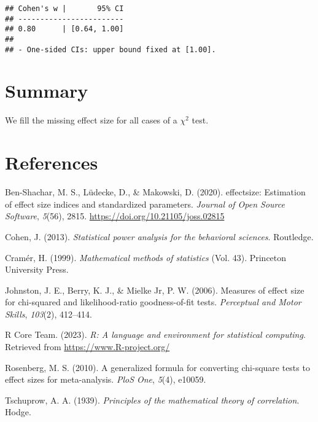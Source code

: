\documentclass[
]{article}
\newlength{\cslhangindent}
\newlength{\cslentryspacingunit} %
\newenvironment{CSLReferences}[2] %
 {%
  \setlength{\parindent}{0pt}
  \ifodd #1
  \let\oldpar\par
  \def\par{\hangindent=\cslhangindent\oldpar}
  \fi
  \setlength{\parskip}{#2\cslentryspacingunit}
 }%
 {}
\begin{document}
\begin{verbatim}
## Cohen's w |       95% CI
## ------------------------
## 0.80      | [0.64, 1.00]
## 
## - One-sided CIs: upper bound fixed at [1.00].
\end{verbatim}

\hypertarget{summary}{%
\section{Summary}\label{summary}}

We fill the missing effect size for all cases of a \(\chi^2\) test.

\hypertarget{references}{%
\section*{References}\label{references}}

\hypertarget{refs}{}
\begin{CSLReferences}{1}{0}
\leavevmode{}%
Ben-Shachar, M. S., Lüdecke, D., \& Makowski, D. (2020). {e}ffectsize:
Estimation of effect size indices and standardized parameters.
\emph{Journal of Open Source Software}, \emph{5}(56), 2815.
\url{https://doi.org/10.21105/joss.02815}

\leavevmode{}%
Cohen, J. (2013). \emph{Statistical power analysis for the behavioral
sciences}. Routledge.

\leavevmode{}%
Cramér, H. (1999). \emph{Mathematical methods of statistics} (Vol. 43).
Princeton University Press.

\leavevmode{}%
Johnston, J. E., Berry, K. J., \& Mielke Jr, P. W. (2006). Measures of
effect size for chi-squared and likelihood-ratio goodness-of-fit tests.
\emph{Perceptual and Motor Skills}, \emph{103}(2), 412--414.

\leavevmode{}%
R Core Team. (2023). \emph{R: A language and environment for statistical
computing}. Retrieved from \url{https://www.R-project.org/}

\leavevmode{}%
Rosenberg, M. S. (2010). A generalized formula for converting chi-square
tests to effect sizes for meta-analysis. \emph{PloS One}, \emph{5}(4),
e10059.

\leavevmode{}%
Tschuprow, A. A. (1939). \emph{Principles of the mathematical theory of
correlation}. Hodge.

\end{CSLReferences}
\end{document}
